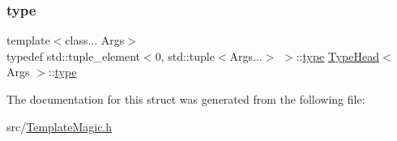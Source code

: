 \subsubsection{\texorpdfstring{type}{type}}
{\footnotesize\ttfamily template$<$class... Args$>$ \\
typedef std\+::tuple\+\_\+element$<$0, std\+::tuple$<$Args...$>$ $>$\+::\hyperlink{struct_type_head_a9595415877619fea585771991836e9a2}{type} \hyperlink{struct_type_head}{Type\+Head}$<$ Args $>$\+::\hyperlink{struct_type_head_a9595415877619fea585771991836e9a2}{type}}



The documentation for this struct was generated from the following file\+:\begin{DoxyCompactItemize}
\item 
src/\hyperlink{_template_magic_8h}{Template\+Magic.\+h}\end{DoxyCompactItemize}
